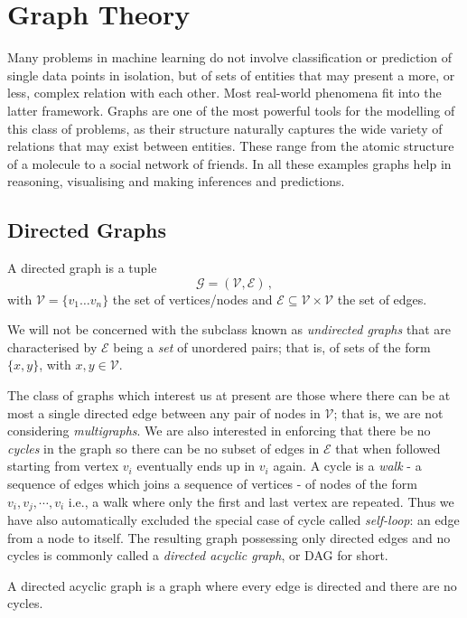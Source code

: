 \section{Graph Theory} \label{sec:graph-theory}
Many problems in machine learning do not involve classification or prediction of single data points in isolation, but of sets of entities that may present a more, or less, complex relation with each other. 
Most real-world phenomena fit into the latter framework.
Graphs are one of the most powerful tools for the modelling of this class of problems, as their structure naturally captures the wide variety of relations that may exist between entities.
These range from the atomic structure of a molecule to a social network of friends.  
In all these examples graphs help in reasoning, visualising and making inferences and predictions.

\subsection{Directed Graphs} \label{subsec:graphs}
\begin{definition}
	A directed graph is a tuple 
	\begin{equation*}
		\mathcal{G} = (\mathcal{V}, \mathcal{E}) \,,
	\end{equation*}
with $\mathcal{V} = \{ v_1 \ldots v_n \}$ the set of vertices/nodes and $\mathcal{E}\subseteq \mathcal{V} \times \mathcal{V}$ the set of edges.
\end{definition}
We will not be concerned with the subclass known as \textit{undirected graphs} that are characterised by $\mathcal{E}$ being a \textit{set} of unordered pairs; that is, of sets of the form $\{x,y\}$, with $x,y \in \mathcal{V}$.

The class of graphs which interest us at present are those where there can be at most a single directed edge between any pair of nodes in $\mathcal{V}$; that is, we are not considering \textit{multigraphs}.
We are also interested in enforcing that there be no \textit{cycles} in the graph so there can be no subset of edges in $\mathcal{E}$ that when followed starting from vertex $v_i$ eventually ends up in $v_i$ again.
A cycle is a \textit{walk} - a sequence of edges which joins a sequence of vertices - of nodes of the form $v_i, v_j, \cdots, v_i$ i.e., a walk where only the first and last vertex are repeated.
Thus we have also automatically excluded the special case of cycle called \textit{self-loop}: an edge from a node to itself. 
The resulting graph possessing only directed edges and no cycles is commonly called a \textit{directed acyclic graph}, or DAG for short.  
\begin{definition} \label{def:dag}
	A directed acyclic graph is a graph where every edge is directed and there are no cycles.
\end{definition}

